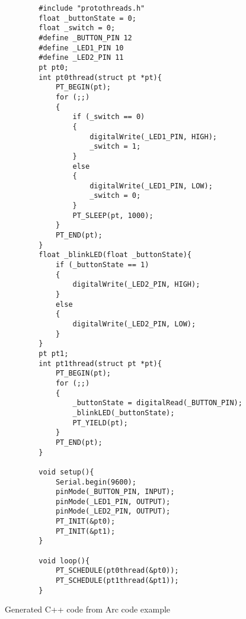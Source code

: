 \begin{listing}[htb!]
    \begin{verbatim}
        #include "protothreads.h"
        float _buttonState = 0;
        float _switch = 0;
        #define _BUTTON_PIN 12
        #define _LED1_PIN 10
        #define _LED2_PIN 11
        pt pt0;
        int pt0thread(struct pt *pt){
            PT_BEGIN(pt);
            for (;;)
            {
                if (_switch == 0)
                {
                    digitalWrite(_LED1_PIN, HIGH);
                    _switch = 1;
                }
                else
                {
                    digitalWrite(_LED1_PIN, LOW);
                    _switch = 0;
                }
                PT_SLEEP(pt, 1000);
            }
            PT_END(pt);
        }
        float _blinkLED(float _buttonState){
            if (_buttonState == 1)
            {
                digitalWrite(_LED2_PIN, HIGH);
            }
            else
            {
                digitalWrite(_LED2_PIN, LOW);
            }
        }
        pt pt1;
        int pt1thread(struct pt *pt){
            PT_BEGIN(pt);
            for (;;)
            {
                _buttonState = digitalRead(_BUTTON_PIN);
                _blinkLED(_buttonState);
                PT_YIELD(pt);
            }
            PT_END(pt);
        }

        void setup(){
            Serial.begin(9600);
            pinMode(_BUTTON_PIN, INPUT);
            pinMode(_LED1_PIN, OUTPUT);
            pinMode(_LED2_PIN, OUTPUT);
            PT_INIT(&pt0);
            PT_INIT(&pt1);
        }

        void loop(){
            PT_SCHEDULE(pt0thread(&pt0));
            PT_SCHEDULE(pt1thread(&pt1));
        }
    \end{verbatim}
    \caption{Generated C++ code from Arc code example}
    \label{lst:generated C++ code from Arc code example}
\end{listing}